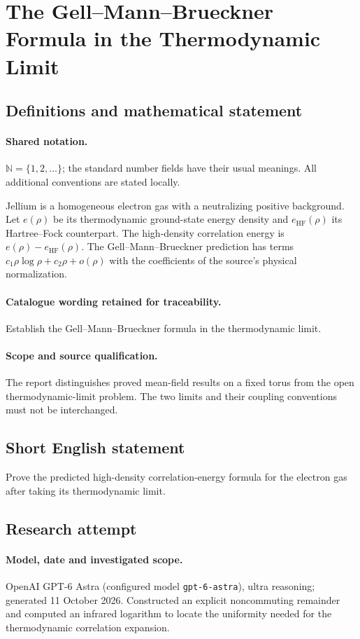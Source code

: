 \documentclass[11pt]{article}
\begin{document}
\section{The Gell–Mann–Brueckner Formula in the Thermodynamic Limit}\label{statement}

\subsection{Definitions and mathematical statement}

\paragraph{Shared notation.}$\mathbb N=\{1,2,\ldots\}$; the standard number fields have their usual meanings. All additional conventions are stated locally.


Jellium is a homogeneous electron gas with a neutralizing positive background. Let $e(\rho)$ be its thermodynamic ground-state energy density and $e_{\mathrm{HF}}(\rho)$ its Hartree--Fock counterpart. The high-density correlation energy is $e(\rho)-e_{\mathrm{HF}}(\rho)$. The Gell--Mann--Brueckner prediction has terms $c_1\rho\log\rho+c_2\rho+o(\rho)$ with the coefficients of the source's physical normalization.

\paragraph{Catalogue wording retained for traceability.}
Establish the Gell–Mann–Brueckner formula in the thermodynamic limit.

\paragraph{Scope and source qualification.}The report distinguishes proved mean-field results on a fixed torus from the open thermodynamic-limit problem. The two limits and their coupling conventions must not be interchanged.
\subsection{Short English statement}
Prove the predicted high-density correlation-energy formula for the electron gas after taking its thermodynamic limit.
\subsection{Research attempt}
\paragraph{Model, date and investigated scope.}
OpenAI GPT-6 Astra (configured model \texttt{gpt-6-astra}), ultra reasoning; generated 11 October 2026. Constructed an explicit noncommuting remainder and computed an infrared logarithm to locate the uniformity needed for the thermodynamic correlation expansion.
\end{document}
